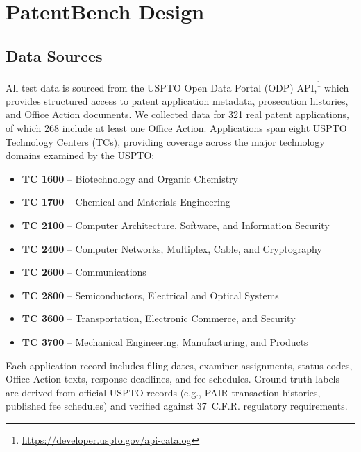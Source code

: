 \documentclass[11pt]{article}
\begin{document}
\section{PatentBench Design}
\label{sec:design}

\subsection{Data Sources}
\label{sec:data}

All test data is sourced from the USPTO Open Data Portal (ODP) API,\footnote{\url{https://developer.uspto.gov/api-catalog}} which provides structured access to patent application metadata, prosecution histories, and Office Action documents. We collected data for 321 real patent applications, of which 268 include at least one Office Action. Applications span eight USPTO Technology Centers (TCs), providing coverage across the major technology domains examined by the USPTO:

\begin{itemize}[leftmargin=*]
    \item \textbf{TC 1600} -- Biotechnology and Organic Chemistry
    \item \textbf{TC 1700} -- Chemical and Materials Engineering
    \item \textbf{TC 2100} -- Computer Architecture, Software, and Information Security
    \item \textbf{TC 2400} -- Computer Networks, Multiplex, Cable, and Cryptography
    \item \textbf{TC 2600} -- Communications
    \item \textbf{TC 2800} -- Semiconductors, Electrical and Optical Systems
    \item \textbf{TC 3600} -- Transportation, Electronic Commerce, and Security
    \item \textbf{TC 3700} -- Mechanical Engineering, Manufacturing, and Products
\end{itemize}

Each application record includes filing dates, examiner assignments, status codes, Office Action texts, response deadlines, and fee schedules. Ground-truth labels are derived from official USPTO records (e.g., PAIR transaction histories, published fee schedules) and verified against 37~C.F.R. regulatory requirements.
\end{document}
